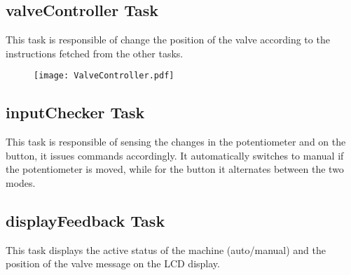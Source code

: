 \subsection{valveController Task}
This task is responsible of change the position of the valve according to the instructions fetched from the other tasks.
\begin{figure}[H]
    \centering
\texttt{[image: ValveController.pdf]}
\end{figure}
\subsection{inputChecker Task}
This task is responsible of sensing the changes in the potentiometer and on the button, it issues commands accordingly.
It automatically switches to manual if the potentiometer is moved, while for the button it alternates between the two modes.
\begin{figure}[H]
    \centering
\end{figure}
\subsection{displayFeedback Task}
This task displays the active status of the machine (auto/manual) and the position of the valve message on the LCD display.
